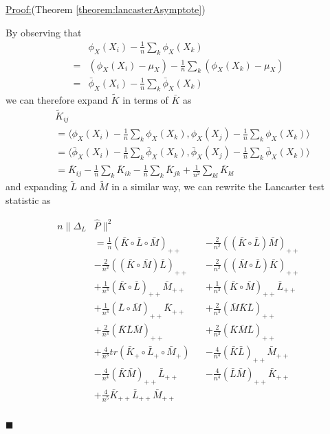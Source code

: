 \documentclass[]{article}
\newenvironment{claimproof}[1]{\par\noindent\underline{Proof:}\space#1}{\hfill $\blacksquare$}
\begin{document}
\begin{claimproof}(Theorem \ref{theorem:lancasterAsymptote})

By observing that
\begin{align*}
& \phi_X(X_i)- \frac{1}{n}\sum_k\phi_X(X_k) \\
= &  (\phi_X(X_i) - \mu_X) - \frac{1}{n}\sum_k (\phi_X(X_k) - \mu_X)\\
= &\bar\phi_X(X_i)- \frac{1}{n}\sum_k\bar\phi_X(X_k)
\end{align*}
we can therefore expand $\tilde{K}$ in terms of $\bar{K}$ as
\begin{align*}
&\tilde{K}_{ij} \\ 
&= \langle\phi_X(X_i)- \frac{1}{n}\sum_k\phi_X(X_k),\phi_X(X_j) - \frac{1}{n}\sum_k\phi_X(X_k)\rangle \\
&= \langle\bar\phi_X(X_i)- \frac{1}{n}\sum_k\bar\phi_X(X_k),\bar\phi_X(X_j) - \frac{1}{n}\sum_k\bar\phi_X(X_k)\rangle \\
&= \bar{K}_{ij} - \frac{1}{n}\sum_k\bar{K}_{ik} - \frac{1}{n}\sum_k\bar{K}_{jk} + \frac{1}{n^2}\sum_{kl}\bar{K}_{kl}
\end{align*}
and expanding $\tilde{L}$ and $\tilde{M}$ in a similar way, we can rewrite the Lancaster test statistic as

\begin{align*}
n\|\Delta_L&\hat{P}\|^2 \\&= 
\frac{1}{n}(\bar{K} \circ \bar{L}\circ \bar{M})_{++} &&-
\frac{2}{n^2}((\bar{K}\circ \bar{L}) \bar{M})_{++} \\&- 
\frac{2}{n^2}((\bar{K} \circ \bar{M}) \bar{L})_{++} &&- 
\frac{2}{n^2}((\bar{M} \circ \bar{L}) \bar{K})_{++} \\&+ 
\frac{1}{n^3}(\bar{K} \circ \bar{L})_{++} \bar{M}_{++} &&+ 
\frac{1}{n^3}(\bar{K} \circ \bar{M})_{++} \bar{L}_{++} \\&+ 
\frac{1}{n^3}(\bar{L} \circ \bar{M})_{++} \bar{K}_{++} &&+ 
\frac{2}{n^3}(\bar{M}\bar{K}\bar{L})_{++} \\&+ 
\frac{2}{n^3}(\bar{K}\bar{L}\bar{M})_{++} &&+ 
\frac{2}{n^3}(\bar{K}\bar{M}\bar{L})_{++} \\&+ 
\frac{4}{n^3}tr(\bar{K}_+ \circ \bar{L}_+ \circ \bar{M}_+) &&-
\frac{4}{n^4}(\bar{K} \bar{L})_{++} \bar{M}_{++} \\& - 
\frac{4}{n^4}(\bar{K}\bar{M})_{++}\bar{L}_{++} &&- 
\frac{4}{n^4}(\bar{L}\bar{M})_{++} \bar{K}_{++} \\&+
\frac{4}{n^5}\bar{K}_{++} \bar{L}_{++} \bar{M}_{++} \\
\end{align*}


\end{claimproof}
\end{document}
